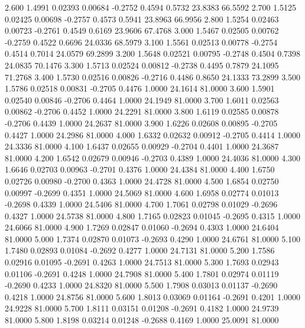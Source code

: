    2.600   1.4991   0.02393   0.00684  -0.2752   0.4594   0.5732  23.8383  66.5592
   2.700   1.5125   0.02425   0.00698  -0.2757   0.4573   0.5941  23.8963  66.9956
   2.800   1.5254   0.02463   0.00723  -0.2761   0.4549   0.6169  23.9606  67.4768
   3.000   1.5467   0.02505   0.00762  -0.2759   0.4522   0.6696  24.0336  68.5979
   3.100   1.5561   0.02513   0.00778  -0.2754   0.4514   0.7014  24.0579  69.2899
   3.200   1.5648   0.02521   0.00795  -0.2748   0.4504   0.7398  24.0835  70.1476
   3.300   1.5713   0.02524   0.00812  -0.2738   0.4495   0.7879  24.1095  71.2768
   3.400   1.5730   0.02516   0.00826  -0.2716   0.4486   0.8650  24.1333  73.2899
   3.500   1.5786   0.02518   0.00831  -0.2705   0.4476   1.0000  24.1614  81.0000
   3.600   1.5901   0.02540   0.00846  -0.2706   0.4464   1.0000  24.1949  81.0000
   3.700   1.6011   0.02563   0.00862  -0.2706   0.4452   1.0000  24.2291  81.0000
   3.800   1.6119   0.02585   0.00878  -0.2706   0.4439   1.0000  24.2637  81.0000
   3.900   1.6226   0.02608   0.00895  -0.2705   0.4427   1.0000  24.2986  81.0000
   4.000   1.6332   0.02632   0.00912  -0.2705   0.4414   1.0000  24.3336  81.0000
   4.100   1.6437   0.02655   0.00929  -0.2704   0.4401   1.0000  24.3687  81.0000
   4.200   1.6542   0.02679   0.00946  -0.2703   0.4389   1.0000  24.4036  81.0000
   4.300   1.6646   0.02703   0.00963  -0.2701   0.4376   1.0000  24.4384  81.0000
   4.400   1.6750   0.02726   0.00980  -0.2700   0.4363   1.0000  24.4728  81.0000
   4.500   1.6854   0.02750   0.00997  -0.2699   0.4351   1.0000  24.5069  81.0000
   4.600   1.6958   0.02774   0.01013  -0.2698   0.4339   1.0000  24.5406  81.0000
   4.700   1.7061   0.02798   0.01029  -0.2696   0.4327   1.0000  24.5738  81.0000
   4.800   1.7165   0.02823   0.01045  -0.2695   0.4315   1.0000  24.6066  81.0000
   4.900   1.7269   0.02847   0.01060  -0.2694   0.4303   1.0000  24.6404  81.0000
   5.000   1.7374   0.02870   0.01073  -0.2693   0.4290   1.0000  24.6761  81.0000
   5.100   1.7480   0.02893   0.01084  -0.2692   0.4277   1.0000  24.7131  81.0000
   5.200   1.7586   0.02916   0.01095  -0.2691   0.4263   1.0000  24.7513  81.0000
   5.300   1.7693   0.02943   0.01106  -0.2691   0.4248   1.0000  24.7908  81.0000
   5.400   1.7801   0.02974   0.01119  -0.2690   0.4233   1.0000  24.8320  81.0000
   5.500   1.7908   0.03013   0.01137  -0.2690   0.4218   1.0000  24.8756  81.0000
   5.600   1.8013   0.03069   0.01164  -0.2691   0.4201   1.0000  24.9228  81.0000
   5.700   1.8111   0.03151   0.01208  -0.2691   0.4182   1.0000  24.9739  81.0000
   5.800   1.8198   0.03214   0.01248  -0.2688   0.4169   1.0000  25.0091  81.0000
